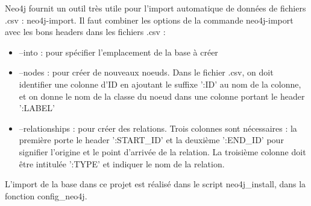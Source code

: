 Neo4j fournit un outil très utile pour l'import automatique de données de fichiers .csv : neo4j-import. Il faut combiner les options de la commande neo4j-import avec les bons headers dans les fichiers .csv :

\begin{itemize}
      \item --into : pour spécifier l'emplacement de la base à créer
      \item --nodes : pour créer de nouveaux noeuds. Dans le fichier .csv, on doit identifier une colonne d'ID en ajoutant le suffixe ':ID' au nom de la colonne, et on donne le nom de la classe du noeud dans une colonne portant le header ':LABEL'
      \item --relationships : pour créer des relations. Trois colonnes sont nécessaires : la première porte le header ':START_ID' et la deuxième ':END_ID' pour signifier l'origine et le point d'arrivée de la relation. La troisième colonne doit être intitulée ':TYPE' et indiquer le nom de la relation.
\end{itemize}

L'import de la base dans ce projet est réalisé dans le script neo4j_install, dans la fonction config_neo4j.
